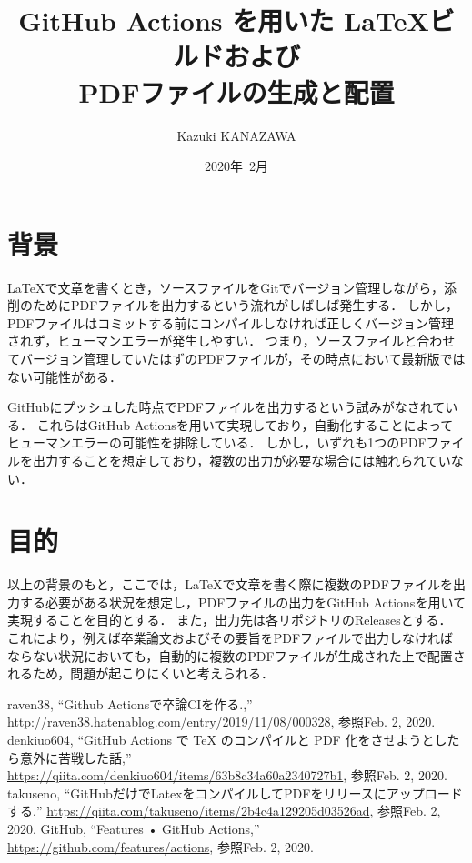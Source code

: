 \documentclass[twocolumn]{jsarticle}
\begin{document}
\title{\huge{GitHub Actions を用いた \LaTeX ビルドおよび\\PDFファイルの生成と配置}}
\author{\Large Kazuki KANAZAWA}
\date{2020年~2月}
\maketitle

\section{背景}


\LaTeX で文章を書くとき，ソースファイルをGitでバージョン管理しながら，添削のためにPDFファイルを出力するという流れがしばしば発生する．
しかし，PDFファイルはコミットする前にコンパイルしなければ正しくバージョン管理されず，ヒューマンエラーが発生しやすい．
つまり，ソースファイルと合わせてバージョン管理していたはずのPDFファイルが，その時点において最新版ではない可能性がある．

GitHubにプッシュした時点でPDFファイルを出力するという試みがなされている\cite{raven38,denkiuo604,takuseno}．
これらはGitHub Actions\cite{github-actions}を用いて実現しており，自動化することによってヒューマンエラーの可能性を排除している．
しかし，いずれも1つのPDFファイルを出力することを想定しており，複数の出力が必要な場合には触れられていない．

\section{目的}

以上の背景のもと，ここでは，\LaTeX で文章を書く際に複数のPDFファイルを出力する必要がある状況を想定し，PDFファイルの出力をGitHub Actionsを用いて実現することを目的とする．
また，出力先は各リポジトリのReleasesとする．
これにより，例えば卒業論文およびその要旨をPDFファイルで出力しなければならない状況においても，自動的に複数のPDFファイルが生成された上で配置されるため，問題が起こりにくいと考えられる．


\begin{thebibliography}{99}
 raven38, ``Github Actionsで卒論CIを作る.,'' \url{http://raven38.hatenablog.com/entry/2019/11/08/000328}, 参照Feb. 2, 2020.
 denkiuo604, ``GitHub Actions で TeX のコンパイルと PDF 化をさせようとしたら意外に苦戦した話,'' \url{https://qiita.com/denkiuo604/items/63b8c34a60a2340727b1}, 参照Feb. 2, 2020.
 takuseno, ``GitHubだけでLatexをコンパイルしてPDFをリリースにアップロードする,'' \url{https://qiita.com/takuseno/items/2b4c4a129205d03526ad}, 参照Feb. 2, 2020.
 GitHub, ``Features • GitHub Actions,'' \url{https://github.com/features/actions}, 参照Feb. 2, 2020.
\end{thebibliography}
\end{document}
